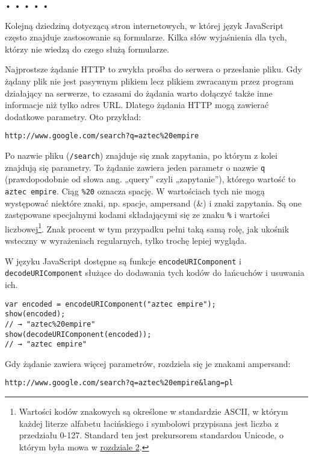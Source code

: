 \begin{center}
• • • • •
\end{center}

  
Kolejną dziedziną dotyczącą stron internetowych, w której język JavaScript często znajduje zastosowanie są formularze. Kilka słów wyjaśnienia dla tych, którzy nie wiedzą do czego służą formularze.

  
Najprostsze żądanie HTTP to zwykła prośba do serwera o przesłanie pliku. Gdy żądany plik nie jest pasywnym plikiem lecz plikiem zwracanym przez program działający na serwerze, to czasami do żądania warto dołączyć także inne informacje niż tylko adres URL. Dlatego żądania HTTP mogą zawierać dodatkowe parametry. Oto przykład:

  
\begin{verbatim} 
http://www.google.com/search?q=aztec%20empire
\end{verbatim}
  
Po nazwie pliku (\texttt{/search}) znajduje się znak zapytania, po którym z kolei znajdują się parametry. To żądanie zawiera jeden parametr o nazwie \texttt{q} (prawdopodobnie od słowa ang. „query” czyli „zapytanie”), którego wartość to \texttt{aztec empire}. Ciąg \texttt{\%20} oznacza spację. W wartościach tych nie mogą występować niektóre znaki, np. spacje, ampersand (\&) i znaki zapytania. Są one zastępowane specjalnymi kodami składającymi się ze znaku \texttt{\%} i wartości liczbowej\footnote{Wartości kodów znakowych są określone w standardzie ASCII, w którym każdej literze alfabetu łacińskiego i symbolowi przypisana jest liczba z przedziału 0-127. Standard ten jest prekursorem standardou Unicode, o którym była mowa w \hyperref[chap:2]{rozdziale 2}.}. Znak procent w tym przypadku pełni taką samą rolę, jak ukośnik wsteczny w wyrażeniach regularnych, tylko trochę lepiej wygląda.

  
W języku JavaScript dostępne są funkcje \texttt{encodeURIComponent} i \texttt{decodeURIComponent} służące do dodawania tych kodów do łańcuchów i usuwania ich.

  
\begin{verbatim} 
var encoded = encodeURIComponent("aztec empire");
show(encoded);
// → "aztec%20empire"
show(decodeURIComponent(encoded));
// → "aztec empire"
\end{verbatim}
  
Gdy żądanie zawiera więcej parametrów, rozdziela się je znakami ampersand:

  
\begin{verbatim} 
http://www.google.com/search?q=aztec%20empire&lang=pl
\end{verbatim}


